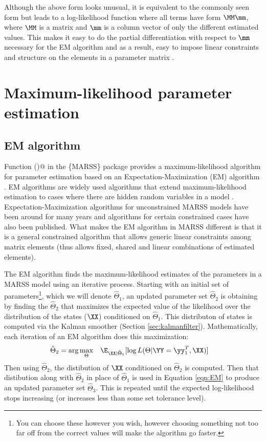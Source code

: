 Although the above form looks unusual, it is equivalent to the commonly seen form but leads to a log-likelihood function where all terms have form 
$\MM\mm$, where $\MM$ is a matrix and $\mm$ is a column vector of only the different estimated values.  This makes it easy to do the partial differentiation with respect
to $\mm$ necessary for the EM algorithm and as a result, easy to impose linear constraints and structure on the elements in a parameter matrix \citep{Holmes2010}.

\section{Maximum-likelihood parameter estimation}

\subsection{EM algorithm}

Function \verb@MARSSkem()@ in the \{MARSS\} package provides a maximum-likelihood algorithm for parameter estimation based on an Expectation-Maximization (EM) algorithm  \citep{Holmes2010}. EM algorithms are widely used algorithms that extend maximum-likelihood estimation to cases where there are hidden random variables in a model \citep{Dempsteretal1977, Harvey1989, HarveyShephard1993, McLachlanKrishnan2008}.   Expectation-Maximization algorithms for unconstrained MARSS models have been around for many years and algorithms for certain constrained cases have also been published.  What makes the EM algorithm in MARSS different is that it is a general constrained algorithm that allows generic linear constraints among matrix elements (thus allows fixed, shared and linear combinations of estimated elements). 

The EM algorithm finds the maximum-likelihood estimates of the parameters in a MARSS model using an iterative process.  Starting with an initial set of parameters\footnote{You can choose these however you wish, however choosing something not too far off from the correct values will make the algorithm go faster.}, which we will denote $\hat{\Theta}_1$, an updated parameter set $\hat{\Theta}_2$ is obtaining by finding the $\hat{\Theta}_2$ that maximizes the expected value of the likelihood over the distribution of the states ($\XX$) conditioned on $\hat{\Theta}_1$. This distributon of states is computed via the Kalman smoother (Section \ref{sec:kalmanfilter}).  Mathematically, each iteration of an EM algorithm does this maximization:
\begin{align}\label{eqn:EM}
	\hat{\Theta}_2 &= \arg\underset{\Theta}{\max} \quad \E_{\XX|\hat{\Theta}_1}[\log L(\Theta |\YY=\yy_1^T,\XX)] \nonumber
\end{align}
Then using $\hat{\Theta}_2$, the distibution of $\XX$ conditioned on $\hat{\Theta}_2$ is computed.  Then that distibution along with $\hat{\Theta}_2$ in place of $\hat{\Theta}_1$ is used in Equation \ref{eqn:EM} to produce an updated parameter set $\hat{\Theta}_3$.  This is repeated until the expected log-likelihood stops increasing (or increases less than some set tolerance level).

